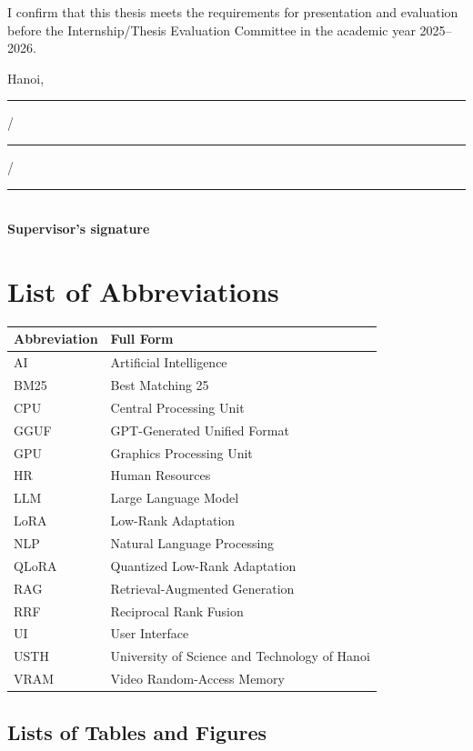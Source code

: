 \documentclass[12pt,a4paper,oneside]{report}
\begin{document}
I confirm that this thesis meets the requirements for presentation and
evaluation before the Internship/Thesis Evaluation Committee in the academic
year 2025--2026.
\vspace{4cm}
\begin{flushright}
Hanoi, \rule{0.5cm}{0.4pt}/\rule{0.5cm}{0.4pt}/\rule{1.2cm}{0.4pt}\\[0.8cm]
\textbf{Supervisor's signature}
\end{flushright}

\newpage
\tableofcontents

\newpage
\chapter*{List of Abbreviations}
\begin{tabular}{@{}p{2.4cm}p{10.2cm}}
\toprule
\textbf{Abbreviation} & \textbf{Full Form} \\
\midrule
AI & Artificial Intelligence \\
BM25 & Best Matching 25 \\
CPU & Central Processing Unit \\
GGUF & GPT-Generated Unified Format \\
GPU & Graphics Processing Unit \\
HR & Human Resources \\
LLM & Large Language Model \\
LoRA & Low-Rank Adaptation \\
NLP & Natural Language Processing \\
QLoRA & Quantized Low-Rank Adaptation \\
RAG & Retrieval-Augmented Generation \\
RRF & Reciprocal Rank Fusion \\
UI & User Interface \\
USTH & University of Science and Technology of Hanoi \\
VRAM & Video Random-Access Memory \\
\bottomrule
\end{tabular}

\vspace{1cm}
\section*{Lists of Tables and Figures}
\listoftables
\vspace{0.5cm}
\listoffigures
\end{document}
